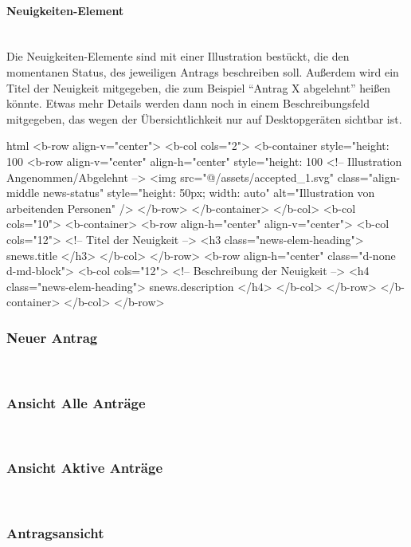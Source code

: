 \paragraph{Neuigkeiten-Element}
~\\
Die Neuigkeiten-Elemente sind mit einer Illustration bestückt, die den momentanen Status, des jeweiligen Antrags beschreiben soll. Außerdem wird ein Titel der Neuigkeit mitgegeben, die zum Beispiel \enquote{Antrag X abgelehnt} heißen könnte. Etwas mehr Details werden dann noch in einem Beschreibungsfeld mitgegeben, das wegen der Übersichtlichkeit nur auf Desktopgeräten sichtbar ist.
\begin{code}{html}
	<b-row align-v="center">
	<b-col cols="2">
	  <b-container style="height: 100%
		<b-row align-v="center" align-h="center" style="height: 100%
		  <!-- Illustration Angenommen/Abgelehnt -->
		  <img
			src="@/assets/accepted_1.svg"
			class="align-middle news-status"
			style="height: 50px; width: auto"
			alt="Illustration von arbeitenden Personen"
		  />
		</b-row>
	  </b-container>
	</b-col>
	<b-col cols="10">
	  <b-container>
		<b-row align-h="center" align-v="center">
		  <b-col cols="12">
			<!-- Titel der Neuigkeit -->
			<h3 class="news-elem-heading">{{ snews.title }}</h3>
		  </b-col>
		</b-row>
		<b-row align-h="center" class="d-none d-md-block">
		  <b-col cols="12">
			<!-- Beschreibung der Neuigkeit -->
			<h4 class="news-elem-heading">{{ snews.description }}</h4>
		  </b-col>
		</b-row>
	  </b-container>
	</b-col>
  </b-row>	
\end{code}

\newpage
\subsubsection{Neuer Antrag}
~\\

\newpage
\subsubsection{Ansicht Alle Anträge}
~\\

\newpage
\subsubsection{Ansicht Aktive Anträge}
~\\

\newpage
\subsubsection{Antragsansicht}
~\\

